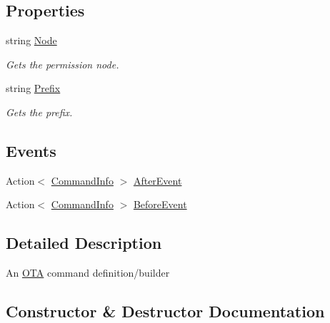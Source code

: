 \subsection*{Properties}
\begin{DoxyCompactItemize}
\item 
string \hyperlink{classOTA_1_1Command_1_1CommandInfo_ad44054822436f80660a4b86199b49fd3}{Node}
\begin{DoxyCompactList}\small\item\em Gets the permission node. \end{DoxyCompactList}\item 
string \hyperlink{classOTA_1_1Command_1_1CommandInfo_a0bf9d0add9f4a8c150513d661361598c}{Prefix}
\begin{DoxyCompactList}\small\item\em Gets the prefix. \end{DoxyCompactList}\end{DoxyCompactItemize}
\subsection*{Events}
\begin{DoxyCompactItemize}
\item 
Action$<$ \hyperlink{classOTA_1_1Command_1_1CommandInfo}{Command\+Info} $>$ \hyperlink{classOTA_1_1Command_1_1CommandInfo_ab8ad1507610b5a9d460f412eb606cea8}{After\+Event}
\item 
Action$<$ \hyperlink{classOTA_1_1Command_1_1CommandInfo}{Command\+Info} $>$ \hyperlink{classOTA_1_1Command_1_1CommandInfo_abc05ff320f768663bcc90f0125e153cb}{Before\+Event}
\end{DoxyCompactItemize}


\subsection{Detailed Description}
An \hyperlink{namespaceOTA}{O\+T\+A} command definition/builder 



\subsection{Constructor \& Destructor Documentation}
\hypertarget{classOTA_1_1Command_1_1CommandInfo_ab794274d1b3e3e95443b67d441a7cae6}{}
